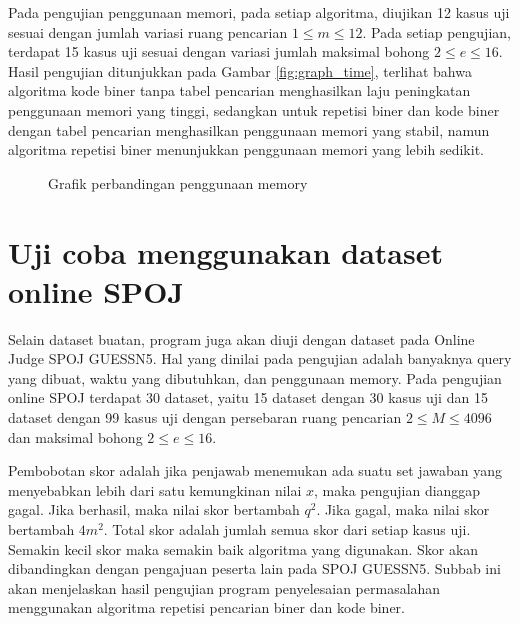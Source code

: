 Pada pengujian penggunaan memori, pada setiap algoritma, diujikan 12 kasus uji sesuai dengan jumlah variasi ruang pencarian $1 \leq m \leq 12$. Pada setiap pengujian, terdapat 15 kasus uji sesuai dengan variasi jumlah maksimal bohong $2 \leq e \leq 16$. Hasil pengujian ditunjukkan pada Gambar \ref{fig:graph_time}, terlihat bahwa algoritma kode biner tanpa tabel pencarian menghasilkan laju peningkatan penggunaan memori yang tinggi, sedangkan untuk repetisi biner dan kode biner dengan tabel pencarian menghasilkan penggunaan memori yang stabil, namun algoritma repetisi biner menunjukkan penggunaan memori yang lebih sedikit.

\begin{figure}
\centering
{}
\caption{Grafik perbandingan penggunaan memory}
\label{fig:graph_memory}
\end{figure}

\section{Uji coba menggunakan dataset online SPOJ}

Selain dataset buatan, program juga akan diuji dengan dataset pada Online Judge SPOJ GUESSN5. Hal yang dinilai pada pengujian adalah banyaknya query yang dibuat, waktu yang dibutuhkan, dan penggunaan memory. Pada pengujian online SPOJ terdapat 30 dataset, yaitu 15 dataset dengan 30 kasus uji dan 15 dataset dengan 99 kasus uji dengan persebaran ruang pencarian $2 \leq M \leq 4096$ dan maksimal bohong $2 \leq e \leq 16$.

Pembobotan skor adalah jika penjawab menemukan ada suatu set jawaban yang menyebabkan lebih dari satu kemungkinan nilai $x$, maka pengujian dianggap gagal. Jika berhasil, maka nilai skor bertambah $q^2$. Jika gagal, maka nilai skor bertambah $4m^2$. Total skor adalah jumlah semua skor dari setiap kasus uji. Semakin kecil skor maka semakin baik algoritma yang digunakan. Skor akan dibandingkan dengan pengajuan peserta lain pada SPOJ GUESSN5. Subbab ini akan menjelaskan hasil pengujian program penyelesaian permasalahan menggunakan algoritma repetisi pencarian biner dan kode biner.


